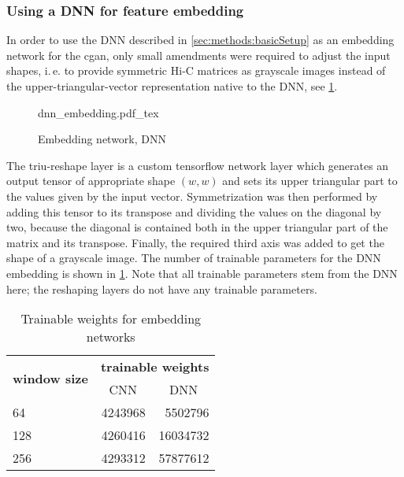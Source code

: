 \subsubsection{Using a DNN for feature embedding} \label{sec:methods:dnn-embedding}
In order to use the DNN described in \cref{sec:methods:basicSetup} as an embedding network
for the \acrshort{cgan}, only small amendments were required to adjust the input shapes,
i.\,e. to provide symmetric Hi-C matrices as grayscale images instead of the upper-triangular-vector representation
native to the DNN, see \cref{fig:methods:dnn-embedding}.
\begin{figure}[p]
    \scriptsize
    \centering
    {dnn_embedding.pdf_tex}
    \caption{Embedding network, DNN} \label{fig:methods:dnn-embedding}
\end{figure}
The triu-reshape layer is a custom tensorflow network layer which generates an output tensor
of appropriate shape $(w,w)$ and sets its upper triangular part to the values given by the input vector.
Symmetrization was then performed by adding this tensor to its transpose and dividing the values on the diagonal by two,
because the diagonal is contained both in the upper triangular part of the matrix and its transpose.
Finally, the required third axis was added to get the shape of a grayscale image.
The number of trainable parameters for the DNN embedding is shown in \cref{tab:methods:embedding_network_params}.
Note that all trainable parameters stem from the DNN here; the reshaping layers do not have any trainable parameters.
\begin{table}[htbp]
\centering
\begin{tabular}{lrr}
\hline
\multicolumn{1}{c}{\multirow{2}{*}{\textbf{window size}}} & \multicolumn{2}{c}{\textbf{trainable weights}}    \\
\multicolumn{1}{c}{}                                     & \multicolumn{1}{c}{CNN} & \multicolumn{1}{c}{DNN} \\ \hline
64                                                       & 4243968                 & 5502796                 \\
128                                                      & 4260416                 & 16034732                \\
256                                                      & 4293312                 & 57877612                \\ \hline
\end{tabular}
\caption{Trainable weights for embedding networks}\label{tab:methods:embedding_network_params}
\end{table}

